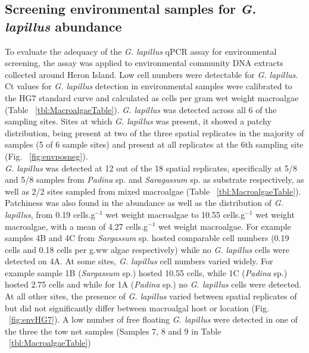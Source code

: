 \documentclass[12pt]{article}
\begin{document}
\subsection*{Screening environmental samples for \emph{G. lapillus} abundance }%
\FloatBarrier
To evaluate the adequacy of the \emph{G. lapillus} %
qPCR assay for environmental screening, the assay was applied to environmental community DNA extracts collected around Heron Island. 
Low cell numbers were detectable for \emph{G. lapillus}. 
Ct values for \emph{G. lapillus} detection in environmental samples were calibrated to the HG7 standard curve and calculated as cells per gram wet weight macroalgae (Table ~\ref{tbl:MacroalgaeTable}). 
\emph{G. lapillus} was detected across all 6 of the sampling sites. Sites at which \textit{G. lapillus} was present, it showed a patchy distribution, being present at two of the three spatial replicates in the majority of samples (5 of 6 sample sites) and present at all replicates at the 6th sampling site (Fig. ~\ref{fig:envposneg}). \\
\emph{G. lapillus} was detected at 12 out of the 18 spatial replicates, specifically at 5/8 and 5/8 samples from \emph{Padina} sp. and \emph{Saragassum} sp. as substrate respectively, as well as 2/2 sites sampled from mixed macroalgae (Table ~\ref{tbl:MacroalgaeTable}).
Patchiness was also found in the abundance as well as the distribution of \emph{G. lapillus}, from 0.19 cells.g$^{-1}$ wet weight macroalgae to 10.55 cells.g$^{-1}$ wet weight macroalgae, with a mean of 4.27 cells.g$^{-1}$ wet weight macroalgae. 
For example samples 4B and 4C from \emph{Sargassum} sp. hosted comparable cell numbers (0.19 cells and 0.18 cells per g.ww algae respectively) while no \emph{G. lapillus} cells were detected on 4A.
At some sites, \emph{G. lapillus} cell numbers varied widely. For example sample 1B (\emph{Sargassum} sp.) hosted 10.55 cells, while 1C (\textit{Padina} sp.) hosted 2.75 cells and while for 1A (\emph{Padina} sp.) no \emph{G. lapillus} cells were detected.
At all other sites, the presence of \textit{G. lapillus} varied between spatial replicates of but did not significantly differ between macroalgal host or location (Fig. ~\ref{fig:envHG7}). 
A low number of free floating \textit{G. lapillus} were detected in one of the three the tow net samples (Samples 7, 8 and 9 in Table ~\ref{tbl:MacroalgaeTable})
\end{document}
